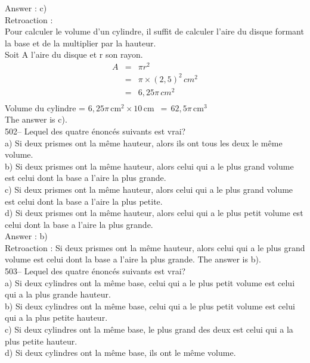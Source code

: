 ﻿\documentclass[letterpaper, 12pt]{article}
\begin{document}
Answer : c)\\

Retroaction : \\
Pour calculer le volume d'un cylindre, il suffit de calculer l'aire du
disque formant la base et de la multiplier par la hauteur.  \\
Soit A l'aire du disque et r son rayon.
\begin{eqnarray*}
A &=& \pi r^{2} \\
&=& \pi \times \left( 2,5\right)^{2}\,cm^{2}\\
&=& 6,25\pi\,cm^{2}\\
\end{eqnarray*}
Volume du cylindre = $6,25\pi$\,cm$^{2} \times 10$\,cm
$\,=\,62,5\pi$\,cm$^{3}$\\
The answer is c).\\


502-- Lequel des quatre \'enonc\'es suivants est vrai?\\
a) Si deux prismes ont la m\^eme hauteur, alors ils ont tous les deux le
m\^eme volume.\\
b) Si deux prismes ont la m\^eme hauteur, alors celui qui a le plus grand
volume est celui dont la base a l'aire la plus grande.\\
c) Si deux prismes ont la m\^eme hauteur, alors celui qui a le plus grand
volume est celui dont la base a l'aire la plus petite.\\
d) Si deux prismes ont la m\^eme hauteur, alors celui qui a le plus petit
volume est celui dont la base a l'aire la plus grande.\\

Answer : b)\\

Retroaction :
Si deux prismes ont la m\^eme hauteur, alors celui qui a le plus grand
volume est celui dont la base a l'aire la plus grande. The answer is
b).\\

503-- Lequel des quatre \'enonc\'es suivants est vrai? \\
a) Si deux cylindres ont la m\^eme base, celui qui a le plus petit volume
est celui qui a la plus grande hauteur.\\
b) Si deux cylindres ont la m\^eme base, celui qui a le plus petit volume
est celui qui a la plus petite hauteur.\\
c) Si deux cylindres ont la m\^eme base, le plus grand des deux est celui
qui a la plus petite hauteur.\\
d) Si deux cylindres ont la m\^eme base, ils ont le m\^eme volume.\\
\end{document}
